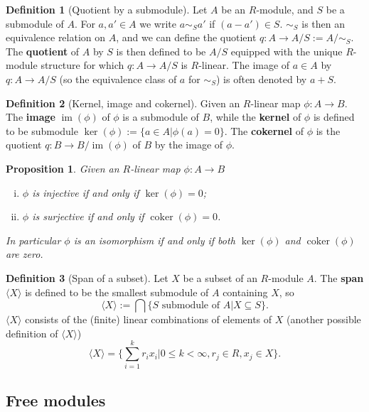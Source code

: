 \documentclass[a4paper,12pt,parskip=half*,chapterprefix=true,numbers=noendperiod]{scrreprt}
\newcommand{\opname}{\operatorname}
\newtheorem{proposition}{Proposition}[section]
\theoremstyle{definition}
\newtheorem{definition}{Definition}[section]
\theoremstyle{remark}
\begin{document}
\begin{definition}[Quotient by a submodule]
	Let $A$ be an $R$-module, and $S$ be a submodule of $A$. For $a,a'\in A$ we write $a\sim_S a'$ if $(a-a')\in S$. $\sim_S$ is then an equivalence relation on $A$, and we can define the quotient $q:A\to A/S:=A/\sim_S$. The \textbf{quotient} of $A$ by $S$ is then defined to be $A/S$ equipped with the unique $R$-module structure for which $q:A\to A/S$ is $R$-linear. The image of $a\in A$ by $q:A\to A/S$ (so the equivalence class of $a$ for $\sim_S$) is often denoted by $a+S$.
\end{definition}
\begin{definition}[Kernel, image and cokernel]
	Given an $R$-linear map $\phi:A\to B$. The \textbf{image} $\opname{im}(\phi)$ of $\phi$ is a submodule of $B$, while the \textbf{kernel} of $\phi$ is defined to be submodule $\ker(\phi):=\{a\in A|\phi(a)=0\}$. The \textbf{cokernel} of $\phi$ is the quotient $q:B\to B/\opname{im}(\phi)$ of $B$ by the image of $\phi$.
\end{definition}

\begin{proposition}
	Given an $R$-linear map $\phi:A\to B$
	\begin{enumerate}[(i)]
		\item $\phi$ is injective if and only if $\ker(\phi)=0$;
		\item $\phi$ is surjective if and only if $\opname{coker}(\phi)=0$.
	\end{enumerate}
	In particular $\phi$ is an isomorphism if and only if both $\ker(\phi)$ and $\opname{coker}(\phi)$ are zero.
\end{proposition}

\begin{definition}[Span of a subset]
	Let $X$ be a subset of an $R$-module $A$. The \textbf{span} $\langle X\rangle$ is defined to be the smallest submodule of $A$ containing $X$, so
	\begin{equation*}
		\langle X\rangle:=\bigcap\{S\text{ submodule of }A|X\subseteq S\}.
	\end{equation*}
	$\langle X\rangle$ consists of the (finite) linear combinations of elements of $X$ (another possible definition of $\langle X\rangle$)
	\begin{equation*}
		\langle X\rangle=\{\sum_{i=1}^kr_ix_i|0\leq k <\infty, r_j\in R, x_j\in X\}.
	\end{equation*}
\end{definition}


\subsection{Free modules}
\end{document}
